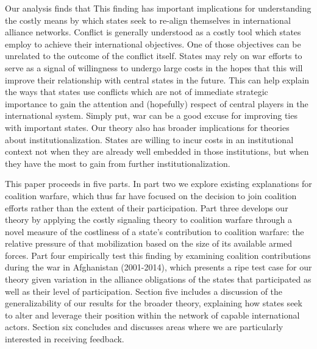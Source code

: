 \documentclass[12pt,letterpaper]{article}
\begin{document}
	Our analysis finds that %
	This finding has important implications for understanding the costly means by which states seek to re-align themselves in international alliance networks. Conflict is generally understood as a costly tool which states employ to achieve their international objectives. One of those objectives can be unrelated to the outcome of the conflict itself. States may rely on war efforts to serve as a signal of willingness to undergo large costs in the hopes that this will improve their relationship with central states in the future. This can help explain the ways that states use conflicts which are not of immediate strategic importance to gain the attention and (hopefully) respect of central players in the international system. Simply put, war can be a good excuse for improving ties with important states. Our theory also has broader implications for theories about institutionalization. States are willing to incur costs in an institutional context not when they are already well embedded in those institutions, but when they have the most to gain from further institutionalization.

	This paper proceeds in five parts. In part two we explore existing explanations for coalition warfare, which thus far have focused on the decision to join coalition efforts rather than the extent of their participation. Part three develops our theory by applying the costly signaling theory to coalition warfare through a novel measure of the costliness of a state's contribution to coalition warfare: the relative pressure of that mobilization based on the size of its available armed forces. Part four empirically test this finding by examining coalition contributions during the war in Afghanistan (2001-2014), which presents a ripe test case for our theory given variation in the alliance obligations of the states that participated as well as their level of participation. Section five includes a discussion of the generalizability of our results for the broader theory, explaining how states seek to alter and leverage their position within the network of capable international actors. Section six concludes and discusses areas where we are particularly interested in receiving feedback.
\end{document}

